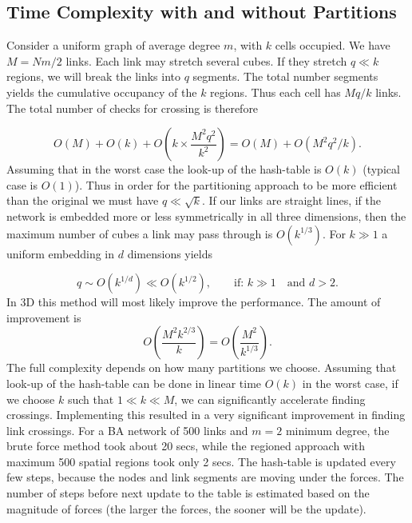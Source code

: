 \documentclass[linenumbers,endfloats,nofootinbib,preprint,floatfix,titlepage,superscriptaddress]{revtex4-1} %
\begin{document}
\subsection{Time Complexity with and without Partitions}
Consider a uniform graph of average degree $m$, with $k$ cells occupied. We have $M = Nm/2$ links. Each link may stretch several cubes. If they stretch $q \ll k $ regions, we will break the links into $q$ segments. The total number segments yields the cumulative occupancy of the $k$ regions. Thus each cell has $Mq/k$ links. 
The total number of checks for crossing is therefore

$$ O(M) + O(k)+ O\left( k \times \frac{M^2 q^2 }{ k^2} \right)= O(M)+ O(M^2 q^2/k). $$
Assuming that in the worst case the look-up of the hash-table is $O(k)$ (typical case is $O(1)$). Thus in order for the partitioning approach to be more efficient than the original we must have $q \ll \sqrt{k}$. If our links are straight lines, if the network is embedded more or less symmetrically in all three dimensions, then the maximum number of cubes a link may pass through is $O(k^{1/3})$. For $k \gg 1$ a uniform embedding in $d$ dimensions yields 

$$ q \sim O(k^{1/d}) \ll O(k^{1/2}), \qquad \mbox{if: } k\gg1 \quad \mbox{and } d> 2.$$ 
In 3D this method will most likely improve the performance. The amount of improvement is
$$ O\left( \frac{M^2 k^{2/3} }{ k} \right) = O\left(\frac{M^2}{ k^{1/3}} \right). $$
The full complexity depends on how many partitions we choose. 
Assuming that look-up of the hash-table can be done in linear time $O(k)$ in the worst case, if we choose $ k$ such that $1\ll k \ll M$, we can significantly accelerate finding crossings.  
Implementing this resulted in a very significant improvement in finding link crossings. For a BA network of 500 links and $m=2$ minimum degree, the brute force method took about 20 secs, while the regioned approach with maximum 500 spatial regions took only 2 secs. 
The hash-table is updated every few steps, because the nodes and link segments are moving under the forces. 
The number of steps before next update to the table is estimated based on the magnitude of forces (the larger the forces, the sooner will be the update).
\end{document}
